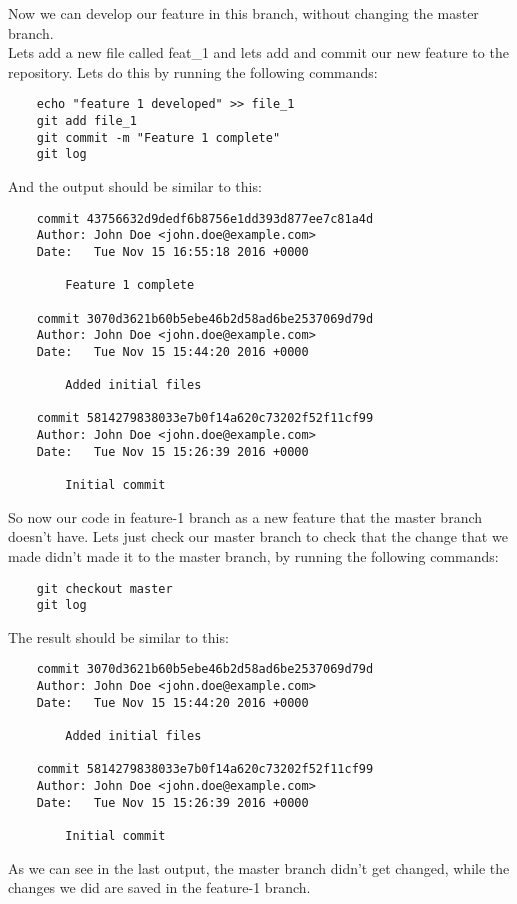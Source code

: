\documentclass{article}
\begin{document}
Now we can develop our feature in this branch, without changing the master branch.\\
Lets add a new file called feat\_1 and lets add and commit our new feature to the repository. Lets do this by running the following commands:

\begin{lstlisting}
	echo "feature 1 developed" >> file_1
	git add file_1
	git commit -m "Feature 1 complete"
	git log
\end{lstlisting}

And the output should be similar to this:

\begin{lstlisting}
	commit 43756632d9dedf6b8756e1dd393d877ee7c81a4d
	Author: John Doe <john.doe@example.com>
	Date:   Tue Nov 15 16:55:18 2016 +0000

    	Feature 1 complete

	commit 3070d3621b60b5ebe46b2d58ad6be2537069d79d
	Author: John Doe <john.doe@example.com>
	Date:   Tue Nov 15 15:44:20 2016 +0000

    	Added initial files

	commit 5814279838033e7b0f14a620c73202f52f11cf99
	Author: John Doe <john.doe@example.com>
	Date:   Tue Nov 15 15:26:39 2016 +0000

    	Initial commit
\end{lstlisting}

So now our code in feature-1 branch as a new feature that the master branch doesn't have. Lets just check our master branch to check that the change that we made didn't made it to the master branch, by running the following commands:

\begin{lstlisting}
	git checkout master
	git log
\end{lstlisting}

The result should be similar to this:

\begin{lstlisting}
	commit 3070d3621b60b5ebe46b2d58ad6be2537069d79d
	Author: John Doe <john.doe@example.com>
	Date:   Tue Nov 15 15:44:20 2016 +0000

    	Added initial files

	commit 5814279838033e7b0f14a620c73202f52f11cf99
	Author: John Doe <john.doe@example.com>
	Date:   Tue Nov 15 15:26:39 2016 +0000

    	Initial commit
\end{lstlisting}

As we can see in the last output, the master branch didn't get changed, while the changes we did are saved in the feature-1 branch.\\
\end{document}
